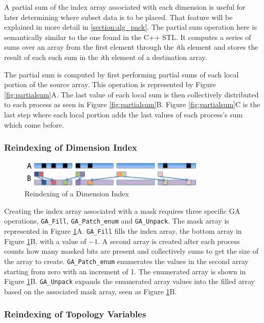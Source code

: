 A partial sum of the index array associated with each dimension is useful for
later determining where subset data is to be placed.  That feature will be
explained in more detail in \ref{section:alg_pack}.  The partial sum operation
here is semantically similar to the one found in the C++ STL\cite{CXXSTL}.  It
computes a series of sums over an array from the first element through the
\emph{i}th element and stores the result of each such sum in the \emph{i}th
element of a destination array.

The partial sum is computed by first performing partial sums of each local
portion of the source array.  This operation is represented by Figure
\ref{fig:partialsum}A.  The last value of each local sum is then collectively
distributed to each process as seen in Figure \ref{fig:partialsum}B.  Figure
\ref{fig:partialsum}C is the last step where each local portion adds the last
values of each process's sum which come before.

\subsubsection{Reindexing of Dimension Index}

\begin{figure}[!t]
\center
\includegraphics[width=3.5in]{images/unpack_label}
\caption{Reindexing of a Dimension Index}
\label{fig:unpack}
\end{figure}

Creating the index array associated with a mask requires three specific GA
operations, \verb=GA_Fill=, \verb=GA_Patch_enum= and \verb=GA_Unpack=.  The
mask array is represented in Figure \ref{fig:unpack}A.  \verb=GA_Fill= fills
the index array, the bottom array in Figure \ref{fig:unpack}B,  with a value
of $-1$.  A second array is created after each process counts how many masked
bits are present and collectively sums to get the size of the array to create.
\verb=GA_Patch_enum= enumerates the values in the second array starting from
zero with an increment of 1.  The enumerated array is shown in Figure
\ref{fig:unpack}B.  \verb=GA_Unpack= expands the enumerated array values into
the filled array based on the associated mask array, seen as Figure
\ref{fig:unpack}B.

\subsubsection{Reindexing of Topology Variables}

